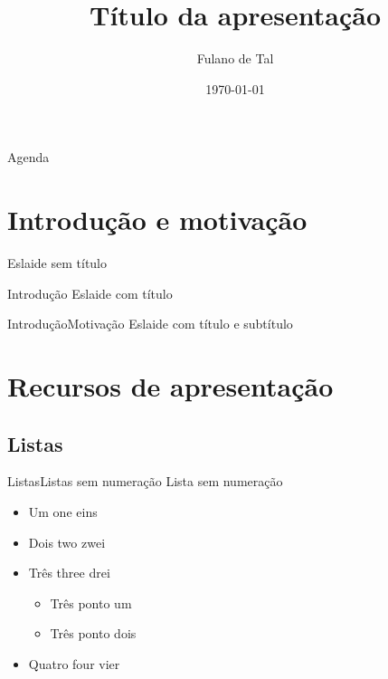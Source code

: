 \documentclass[
	brazilian, %
	12pt, %
]{beamer}
\title{Título da apresentação}
\author{Fulano de Tal}
\date{\today} %
\begin{document}
\begin{frame}
	\titlepage	
\end{frame}

\begin{frame}{Agenda}
	\tableofcontents
\end{frame}


%

\section{Introdução e motivação}
\begin{frame}
	Eslaide sem título
\end{frame}

\begin{frame}{Introdução}
	Eslaide com título
\end{frame}

\begin{frame}{Introdução}{Motivação}
	Eslaide com título e subtítulo
\end{frame}


\section[Recursos]{Recursos de apresentação}

\subsection{Listas}

\begin{frame}{Listas}{Listas sem numeração}
	Lista sem numeração
	
	\begin{itemize}
		\item Um one eins
		\item Dois two zwei
		\item Três three drei
			\begin{itemize}
				\item Três ponto um
				\item Três ponto dois
			\end{itemize}
		\item Quatro four vier
	\end{itemize}
\end{frame}
\end{document}
